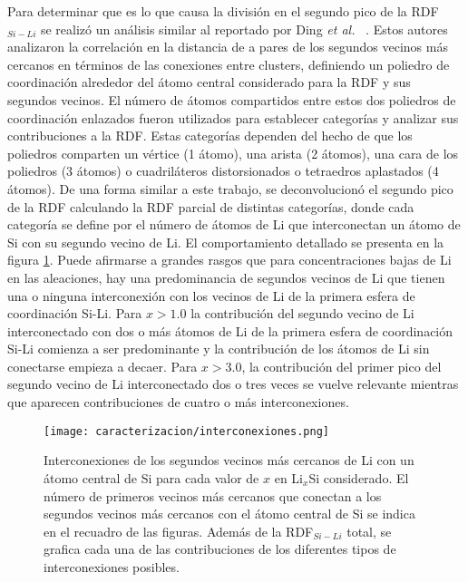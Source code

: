 Para determinar que es lo que causa la división en el segundo pico de la 
RDF$_{Si-Li}$ se realizó un análisis similar al reportado por Ding \textit{et al.}
~\cite{ding2015}. Estos autores analizaron la correlación en la distancia de a
pares de los segundos vecinos más cercanos en términos de las conexiones entre
clusters, definiendo un poliedro de coordinación alrededor del átomo central 
considerado para la RDF y sus segundos vecinos. El número de átomos compartidos
entre estos dos poliedros de coordinación enlazados fueron utilizados para 
establecer categorías y analizar sus contribuciones a la RDF. Estas categorías
dependen del hecho de que los poliedros comparten un vértice (1 átomo), una 
arista (2 átomos), una cara de los poliedros (3 átomos) o cuadriláteros 
distorsionados o tetraedros aplastados (4 átomos). De una forma similar a este 
trabajo, se deconvolucionó el segundo pico de la RDF calculando la RDF parcial 
de distintas categorías, donde cada categoría se define por el número de átomos de
Li que interconectan un átomo de Si con su segundo vecino de Li. El comportamiento
detallado se presenta en la figura \ref{fig:interconexiones}. Puede afirmarse a 
grandes rasgos que para concentraciones bajas de Li en las aleaciones, hay una 
predominancia de segundos vecinos de Li que tienen una o ninguna interconexión 
con los vecinos de Li de la primera esfera de coordinación Si-Li. Para $x > 1.0$
la contribución del segundo vecino de Li interconectado con dos o más átomos de 
Li de la primera esfera de coordinación Si-Li comienza a ser predominante y la
contribución de los átomos de Li sin conectarse empieza a decaer. Para $x > 3.0$,
la contribución del primer pico del segundo vecino de Li interconectado dos o
tres veces se vuelve relevante mientras que aparecen contribuciones de cuatro o
más interconexiones.
\begin{figure}[th]
    \centering
    \texttt{[image: caracterizacion/interconexiones.png]}
    \caption{Interconexiones de los segundos vecinos más cercanos de Li con un 
    átomo central de Si para cada valor de $x$ en Li$_x$Si considerado. El número 
    de primeros vecinos más cercanos que conectan a los segundos vecinos más 
    cercanos con el átomo central de Si se indica en el recuadro de las figuras. 
    Además de la RDF$_{Si-Li}$ total, se grafica cada una de las contribuciones 
    de los diferentes tipos de interconexiones posibles.}
    \label{fig:interconexiones}
\end{figure}

